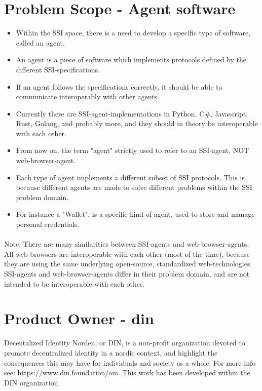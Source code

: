 \newpage



\section{Problem Scope - Agent software} 
\begin{itemize}
    \item Within the SSI space, there is a need to develop a specific type of software, called an agent.
    \item An agent is a piece of software which implements protocols defined by the different SSI-specifications.
    \item If an agent follows the specifications correctly, it should be able to communicate interoperably with other agents.
    \item Currently there are SSI-agent-implementations in Python, C#, Javascript, Rust, Golang, and probably more, and they should in theory be interoperable with each other. 
    \item From now on, the term "agent" strictly used to refer to an SSI-agent, NOT web-browser-agent.
    \item Each type of agent implements a different subset of SSI protocols. This is because different agents are made to solve different problems within the SSI problem domain.
    \item For instance a "Wallet", is a specific kind of agent, used to store and manage personal credentials.
\end{itemize}

\paragraph{}
Note: There are many similarities between SSI-agents and web-browser-agents. All web-browsers are interoperable with each other (most of the time), because they are using the same underlying open-source, standardized web-technologies. SSI-agents and web-browser-agents differ in their problem domain, and are not intended to be interoperable with each other.



\section{Product Owner - \acrfull{din}}

Decentalized Identity Norden, or DIN, is a non-profit organization devoted to promote decentralized identity in a nordic context, and highlight the consequences this may have for individuals and society as a whole. For more info see: https://www.din.foundation/om. This work has been developed within the DIN organization.



